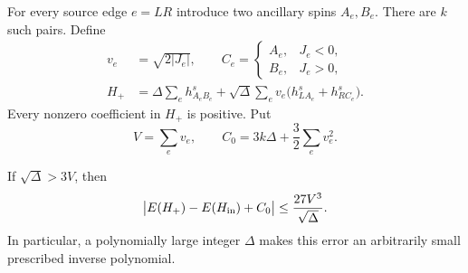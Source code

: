 For every source edge $e=LR$ introduce two ancillary spins $A_e,B_e$.
There are $k$ such pairs.  Define
\begin{equation}\label{eq:positive-gadget}
 \begin{split}
 v_e&=\sqrt{2|J_e|},\qquad
 C_e=\begin{cases}A_e,&J_e<0,\\ B_e,&J_e>0,\end{cases}\\
 H_+&=\Delta\sum_e h^s_{A_eB_e}
    +\sqrt\Delta\sum_e v_e
          \bigl(h^s_{LA_e}+h^s_{RC_e}\bigr).
 \end{split}
\end{equation}
Every nonzero coefficient in $H_+$ is positive.  Put
\begin{equation}\label{eq:spin-shift}
 V=\sum_e v_e,\qquad
 C_0=3k\Delta+\frac32\sum_e v_e^2.
\end{equation}

\begin{proposition}\label{prop:positive-spin}
If $\sqrt\Delta>3V$, then
\begin{equation}\label{eq:positive-spin-error}
 \bigl|E(H_+)-E(H_{\rm in})+C_0\bigr|
       \leq\frac{27V^3}{\sqrt\Delta}.
\end{equation}
In particular, a polynomially large integer $\Delta$ makes this error
an arbitrarily small prescribed inverse polynomial.
\end{proposition}

